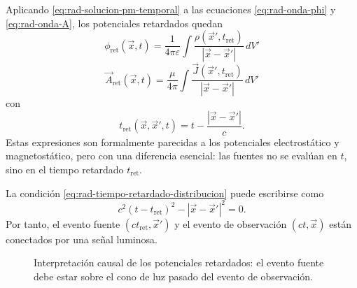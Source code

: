 \documentclass[../main.tex]{subfiles}
\begin{document}
Aplicando \eqref{eq:rad-solucion-pm-temporal} a las ecuaciones \eqref{eq:rad-onda-phi} y \eqref{eq:rad-onda-A}, los potenciales retardados quedan
\begin{equation}
    \boxed{
    \phi_{\mathrm{ret}}(\vec x,t)=
    \frac{1}{4\pi\varepsilon}\int
    \frac{\rho(\vec x',t_{\mathrm{ret}})}{|\vec x-\vec x'|}\,dV'
    }
    \label{eq:rad-potencial-escalar-retardado}
\end{equation}
\begin{equation}
    \boxed{
    \vec A_{\mathrm{ret}}(\vec x,t)=
    \frac{\mu}{4\pi}\int
    \frac{\vec J(\vec x',t_{\mathrm{ret}})}{|\vec x-\vec x'|}\,dV'
    }
    \label{eq:rad-potencial-vectorial-retardado}
\end{equation}
con
\begin{equation}
    \boxed{
    t_{\mathrm{ret}}(\vec x,\vec x',t)=
    t-\frac{|\vec x-\vec x'|}{c}.
    }
    \label{eq:rad-tiempo-retardado-distribucion}
\end{equation}
Estas expresiones son formalmente parecidas a los potenciales electrostático y magnetostático, pero con una diferencia esencial: las fuentes no se evalúan en $t$, sino en el tiempo retardado $t_{\mathrm{ret}}$.

La condición \eqref{eq:rad-tiempo-retardado-distribucion} puede escribirse como
\begin{equation}
    c^2(t-t_{\mathrm{ret}})^2-|\vec x-\vec x'|^2=0.
    \label{eq:rad-relacion-tipo-luz-distribucion}
\end{equation}
Por tanto, el evento fuente $(ct_{\mathrm{ret}},\vec x')$ y el evento de observación $(ct,\vec x)$ están conectados por una señal luminosa.

\begin{figure}[ht!]
\centering
{}
\caption{Interpretación causal de los potenciales retardados: el evento fuente debe estar sobre el cono de luz pasado del evento de observación.}
\label{fig:rad-cono-luz-retardado}
\end{figure}
\end{document}

